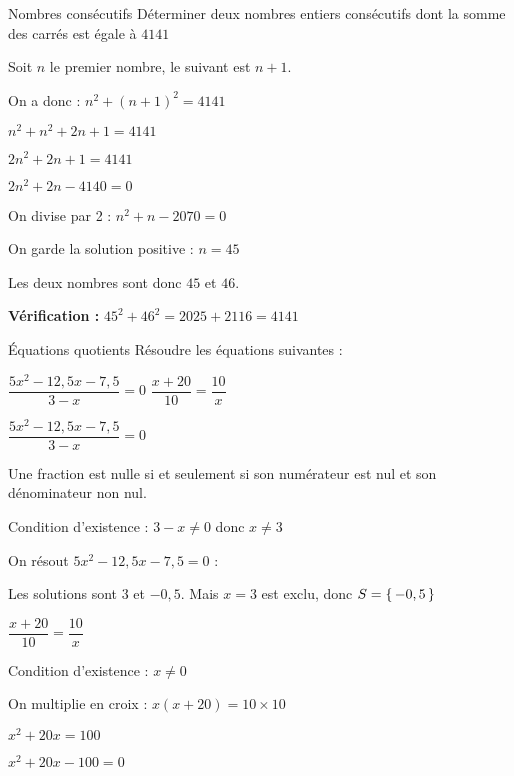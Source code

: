 \vspace{-1mm}
\def\rdifficulty{2}
\begin{EXO}{Nombres consécutifs}{}
Déterminer deux nombres entiers consécutifs dont la somme des carrés est égale à $4141$

\exocorrection

 Soit $n$ le premier nombre, le suivant est $n+1$.

On a donc : $n^2 + (n+1)^2 = 4141$

$n^2 + n^2 + 2n + 1 = 4141$

$2n^2 + 2n + 1 = 4141$

$2n^2 + 2n - 4140 = 0$

On divise par 2 : $n^2 + n - 2070 = 0$


On garde la solution positive : $n = 45$

Les deux nombres sont donc $45$ et $46$.

\textbf{Vérification :} $45^2 + 46^2 = 2025 + 2116 = 4141$ \checkmark
\end{EXO}

\vspace{-1mm}
\def\rdifficulty{2}
\begin{EXO}{Équations quotients}{}
Résoudre les équations suivantes :
\begin{tcbenumerate}[2]
\tcbitem {} $\dfrac{5x^2-12,5x-7,5}{3-x}=0$
\tcbitem {} $\dfrac{x+20}{10}=\dfrac{10}{x}$ \\
\end{tcbenumerate}

\exocorrection

\begin{tcbenumerate}[1]
\tcbitem $\dfrac{5x^2-12,5x-7,5}{3-x}=0$

Une fraction est nulle si et seulement si son numérateur est nul et son dénominateur non nul.

Condition d'existence : $3-x \neq 0$ donc $x \neq 3$

On résout $5x^2-12,5x-7,5=0$ :


Les solutions sont $3$ et $-0,5$. Mais $x=3$ est exclu, donc $S = \ensembleDiscret{-0,5}$

\tcbitem $\dfrac{x+20}{10}=\dfrac{10}{x}$

Condition d'existence : $x \neq 0$

On multiplie en croix : $x(x+20) = 10 \times 10$

$x^2 + 20x = 100$

$x^2 + 20x - 100 = 0$

\end{tcbenumerate}
\end{EXO}

